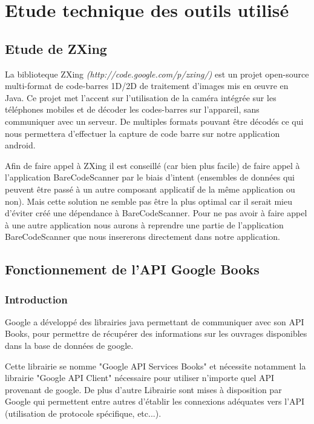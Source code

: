 \section{Etude technique des outils utilisé}

\subsection{Etude de ZXing}
La biblioteque ZXing \textit{(http://code.google.com/p/zxing/)} est un projet open-source multi-format de code-barres 1D/2D de traitement d'images mis en œuvre en Java. Ce projet met l'accent sur l'utilisation de la caméra intégrée sur les téléphones mobiles et de décoder les codes-barres sur l'appareil, sans communiquer avec un serveur.
De multiples formats pouvant être décodés ce qui nous permettera d'effectuer la capture de code barre sur notre application android.

Afin de faire appel à ZXing il est conseillé (car bien plus facile) de faire appel à l'application BareCodeScanner par le biais d'intent (ensembles de données qui peuvent être passé à un autre composant applicatif de la même application ou non). 
Mais cette solution ne semble pas être la plus optimal car il serait mieu d'éviter créé une dépendance à BareCodeScanner.
Pour ne pas avoir à faire appel à une autre application nous aurons à reprendre une partie de l'application BareCodeScanner que nous insererons directement dans notre application. 

\subsection{Fonctionnement de l'API Google Books}

\subsubsection{Introduction}

Google a développé des librairies java permettant de communiquer avec son API Books, pour permettre de récupérer des informations sur les ouvrages disponibles dans la base de données de google.

Cette librairie se nomme "Google API Services Books" et nécessite notamment la librairie "Google API Client" nécessaire pour utiliser n'importe quel API provenant de google. De plus d'autre Librairie sont mises à disposition par Google qui permettent entre autres d'établir les connexions adéquates vers l'API (utilisation de protocole spécifique, etc...).

